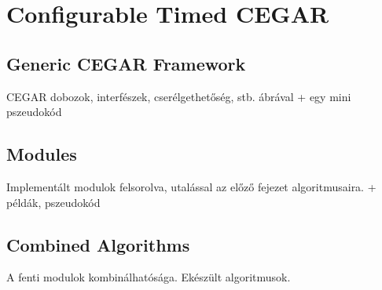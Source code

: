 \chapter{Configurable Timed CEGAR} \label{chap:timed_cegar}


\section{Generic CEGAR Framework}

CEGAR dobozok, interfészek, cserélgethetőség, stb. ábrával + egy mini pszeudokód

\section{Modules}

Implementált modulok felsorolva, utalással az előző fejezet algoritmusaira. + példák, pszeudokód


\section{Combined Algorithms}
A fenti modulok kombinálhatósága. Ekészült algoritmusok.


%
%
%
%
%









